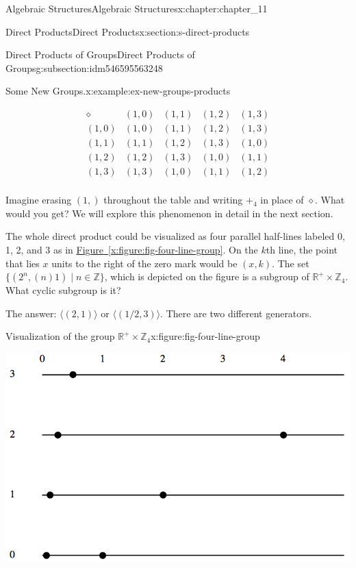 \documentclass[oneside,10pt,]{book}
\newcommand{\xreffont}{\relax}
\numberwithin{equation}{section}
\begin{document}
\begin{chapterptx}{Algebraic Structures}{}{Algebraic Structures}{}{}{x:chapter:chapter_11}
\begin{sectionptx}{Direct Products}{}{Direct Products}{}{}{x:section:s-direct-products}
\begin{subsectionptx}{Direct Products of Groups}{}{Direct Products of Groups}{}{}{g:subsection:idm546595563248}
\begin{example}{Some New Groups.}{x:example:ex-new-groups-products}
\begin{enumerate}[label=(\alph*)]
\begin{equation*}
\begin{array}{c|cccc}
\diamond &(1, 0)& (1, 1)& (1, 2)& (1, 3)\\
\hline
(1, 0)&(1, 0)& (1, 1)& (1, 2)& (1, 3)\\
(1, 1)&(1, 1)& (1, 2)& (1, 3)& (1, 0)\\
(1, 2)&(1, 2)& (1, 3)& (1, 0)& (1, 1)\\
(1, 3)&(1, 3)& (1, 0)& (1, 1)& (1, 2)\\
\end{array}
\end{equation*}
%
\par
Imagine erasing \((1, )\) throughout the table and writing \(+_4\) in place of \(\diamond\). What would you get? We will explore this phenomenon in detail in the next section.%
\par
The whole direct product could be visualized as four parallel half-lines labeled 0, 1, 2, and 3 as in \hyperref[x:figure:fig-four-line-group]{Figure~{\xreffont\ref{x:figure:fig-four-line-group}}}. On the \(k\)th line, the point that lies \(x\) units to the right of the zero mark would be \((x,k)\). The set \(\{(2^n, (n)1) \mid n \in \mathbb{Z}\}\), which is depicted on the figure is a subgroup of \(\mathbb{R}^+\times  \mathbb{Z}_4\). What cyclic subgroup is it?%
\par
The answer: \(\langle (2, 1)\rangle\) or \(\langle(1/2, 3)\rangle\).  There are two different generators.%
\end{enumerate}
%
\begin{figureptx}{Visualization of the group \(\mathbb{R}^+ \times  \mathbb{Z}_4\)}{x:figure:fig-four-line-group}{}%
\begin{image}{0.15}{0.7}{0.15}%
\includegraphics[width=\linewidth]{images/fig-four-line-group.png}
\end{image}%

\end{figureptx}
\end{example}
\end{subsectionptx}
\end{sectionptx}
\end{chapterptx}
\end{document}
